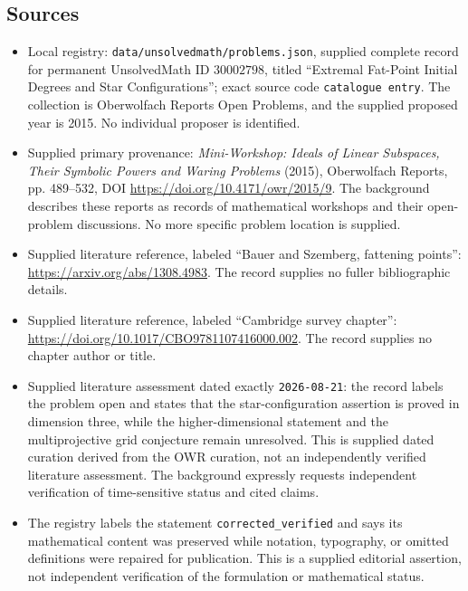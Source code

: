 \documentclass[11pt]{article}
\begin{document}
\subsection{Sources}
\begin{itemize}
\item Local registry: \texttt{data/unsolvedmath/problems.json}, supplied complete record for permanent UnsolvedMath ID \(30002798\), titled ``Extremal Fat-Point Initial Degrees and Star Configurations''; exact source code \texttt{catalogue entry}. The collection is Oberwolfach Reports Open Problems, and the supplied proposed year is 2015. No individual proposer is identified.
\item Supplied primary provenance: \emph{Mini-Workshop: Ideals of Linear Subspaces, Their Symbolic Powers and Waring Problems} (2015), Oberwolfach Reports, pp. 489--532, DOI \url{https://doi.org/10.4171/owr/2015/9}. The background describes these reports as records of mathematical workshops and their open-problem discussions. No more specific problem location is supplied.
\item Supplied literature reference, labeled ``Bauer and Szemberg, fattening points'': \url{https://arxiv.org/abs/1308.4983}. The record supplies no fuller bibliographic details.
\item Supplied literature reference, labeled ``Cambridge survey chapter'': \url{https://doi.org/10.1017/CBO9781107416000.002}. The record supplies no chapter author or title.
\item Supplied literature assessment dated exactly \texttt{2026-08-21}: the record labels the problem open and states that the star-configuration assertion is proved in dimension three, while the higher-dimensional statement and the multiprojective grid conjecture remain unresolved. This is supplied dated curation derived from the OWR curation, not an independently verified literature assessment. The background expressly requests independent verification of time-sensitive status and cited claims.
\item The registry labels the statement \texttt{corrected\_verified} and says its mathematical content was preserved while notation, typography, or omitted definitions were repaired for publication. This is a supplied editorial assertion, not independent verification of the formulation or mathematical status.
\end{itemize}
\end{document}
